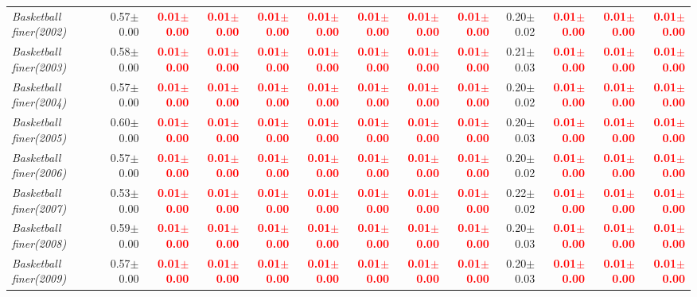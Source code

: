 \documentclass[nohyperref]{article}
\theoremstyle{plain}
\theoremstyle{definition}
\theoremstyle{remark}
\newcommand{\red}[1]{\textcolor{red}{\textbf{#1}}}
\begin{document}
\begin{table*}[!ht]
{\begin{tabular}{lrr|rrrrr|rrrrr}
			{\it Basketball finer(2002)} & 0.57$\pm$0.00 & \red{0.01$\pm$0.00} & \red{0.01$\pm$0.00} & \red{0.01$\pm$0.00} & \red{0.01$\pm$0.00} & \red{0.01$\pm$0.00} & \red{0.01$\pm$0.00} & \red{0.01$\pm$0.00} & 0.20$\pm$0.02 & \red{0.01$\pm$0.00} & \red{0.01$\pm$0.00} & \red{0.01$\pm$0.00} \\
			{\it Basketball finer(2003)} & 0.58$\pm$0.00 & \red{0.01$\pm$0.00} & \red{0.01$\pm$0.00} & \red{0.01$\pm$0.00} & \red{0.01$\pm$0.00} & \red{0.01$\pm$0.00} & \red{0.01$\pm$0.00} & \red{0.01$\pm$0.00} & 0.21$\pm$0.03 & \red{0.01$\pm$0.00} & \red{0.01$\pm$0.00} & \red{0.01$\pm$0.00} \\
			{\it Basketball finer(2004)} & 0.57$\pm$0.00 & \red{0.01$\pm$0.00} & \red{0.01$\pm$0.00} & \red{0.01$\pm$0.00} & \red{0.01$\pm$0.00} & \red{0.01$\pm$0.00} & \red{0.01$\pm$0.00} & \red{0.01$\pm$0.00} & 0.20$\pm$0.02 & \red{0.01$\pm$0.00} & \red{0.01$\pm$0.00} & \red{0.01$\pm$0.00} \\
			{\it Basketball finer(2005)} & 0.60$\pm$0.00 & \red{0.01$\pm$0.00} & \red{0.01$\pm$0.00} & \red{0.01$\pm$0.00} & \red{0.01$\pm$0.00} & \red{0.01$\pm$0.00} & \red{0.01$\pm$0.00} & \red{0.01$\pm$0.00} & 0.20$\pm$0.03 & \red{0.01$\pm$0.00} & \red{0.01$\pm$0.00} & \red{0.01$\pm$0.00} \\
			{\it Basketball finer(2006)} & 0.57$\pm$0.00 & \red{0.01$\pm$0.00} & \red{0.01$\pm$0.00} & \red{0.01$\pm$0.00} & \red{0.01$\pm$0.00} & \red{0.01$\pm$0.00} & \red{0.01$\pm$0.00} & \red{0.01$\pm$0.00} & 0.20$\pm$0.02 & \red{0.01$\pm$0.00} & \red{0.01$\pm$0.00} & \red{0.01$\pm$0.00} \\
			{\it Basketball finer(2007)} & 0.53$\pm$0.00 & \red{0.01$\pm$0.00} & \red{0.01$\pm$0.00} & \red{0.01$\pm$0.00} & \red{0.01$\pm$0.00} & \red{0.01$\pm$0.00} & \red{0.01$\pm$0.00} & \red{0.01$\pm$0.00} & 0.22$\pm$0.02 & \red{0.01$\pm$0.00} & \red{0.01$\pm$0.00} & \red{0.01$\pm$0.00} \\
			{\it Basketball finer(2008)} & 0.59$\pm$0.00 & \red{0.01$\pm$0.00} & \red{0.01$\pm$0.00} & \red{0.01$\pm$0.00} & \red{0.01$\pm$0.00} & \red{0.01$\pm$0.00} & \red{0.01$\pm$0.00} & \red{0.01$\pm$0.00} & 0.20$\pm$0.03 & \red{0.01$\pm$0.00} & \red{0.01$\pm$0.00} & \red{0.01$\pm$0.00} \\
			{\it Basketball finer(2009)} & 0.57$\pm$0.00 & \red{0.01$\pm$0.00} & \red{0.01$\pm$0.00} & \red{0.01$\pm$0.00} & \red{0.01$\pm$0.00} & \red{0.01$\pm$0.00} & \red{0.01$\pm$0.00} & \red{0.01$\pm$0.00} & 0.20$\pm$0.03 & \red{0.01$\pm$0.00} & \red{0.01$\pm$0.00} & \red{0.01$\pm$0.00} \\

\end{tabular}}
\end{table*}
\end{document}
